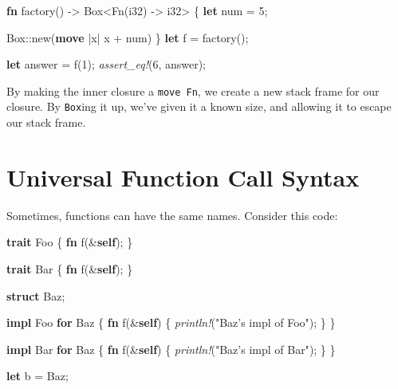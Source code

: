 \documentclass[a4paper,]{book}
\newenvironment{Shaded}{\begin{snugshade}}{\end{snugshade}}
\newcommand{\KeywordTok}[1]{\textcolor[rgb]{0.13,0.29,0.53}{\textbf{{#1}}}}
\newcommand{\DataTypeTok}[1]{\textcolor[rgb]{0.13,0.29,0.53}{{#1}}}
\newcommand{\DecValTok}[1]{\textcolor[rgb]{0.00,0.00,0.81}{{#1}}}
\newcommand{\StringTok}[1]{\textcolor[rgb]{0.31,0.60,0.02}{{#1}}}
\newcommand{\BuiltInTok}[1]{{#1}}
\newcommand{\PreprocessorTok}[1]{\textcolor[rgb]{0.56,0.35,0.01}{\textit{{#1}}}}
\newcommand{\NormalTok}[1]{{#1}}
\begin{document}
\begin{Shaded}
\begin{Highlighting}[]
\KeywordTok{fn} \NormalTok{factory() -> }\DataTypeTok{Box}\NormalTok{<}\BuiltInTok{Fn}\NormalTok{(}\DataTypeTok{i32}\NormalTok{) -> }\DataTypeTok{i32}\NormalTok{> \{}
    \KeywordTok{let} \NormalTok{num = }\DecValTok{5}\NormalTok{;}

    \DataTypeTok{Box}\NormalTok{::new(}\KeywordTok{move} \NormalTok{|x| x + num)}
\NormalTok{\}}
\KeywordTok{let} \NormalTok{f = factory();}

\KeywordTok{let} \NormalTok{answer = f(}\DecValTok{1}\NormalTok{);}
\PreprocessorTok{assert_eq!}\NormalTok{(}\DecValTok{6}\NormalTok{, answer);}
\end{Highlighting}
\end{Shaded}

By making the inner closure a \texttt{move\ Fn}, we create a new stack
frame for our closure. By \texttt{Box}ing it up, we've given it a known
size, and allowing it to escape our stack frame.

\section{Universal Function Call Syntax}\label{sec--ufcs}

Sometimes, functions can have the same names. Consider this code:

\begin{Shaded}
\begin{Highlighting}[]
\KeywordTok{trait} \NormalTok{Foo \{}
    \KeywordTok{fn} \NormalTok{f(&}\KeywordTok{self}\NormalTok{);}
\NormalTok{\}}

\KeywordTok{trait} \NormalTok{Bar \{}
    \KeywordTok{fn} \NormalTok{f(&}\KeywordTok{self}\NormalTok{);}
\NormalTok{\}}

\KeywordTok{struct} \NormalTok{Baz;}

\KeywordTok{impl} \NormalTok{Foo }\KeywordTok{for} \NormalTok{Baz \{}
    \KeywordTok{fn} \NormalTok{f(&}\KeywordTok{self}\NormalTok{) \{ }\PreprocessorTok{println!}\NormalTok{(}\StringTok{"Baz’s impl of Foo"}\NormalTok{); \}}
\NormalTok{\}}

\KeywordTok{impl} \NormalTok{Bar }\KeywordTok{for} \NormalTok{Baz \{}
    \KeywordTok{fn} \NormalTok{f(&}\KeywordTok{self}\NormalTok{) \{ }\PreprocessorTok{println!}\NormalTok{(}\StringTok{"Baz’s impl of Bar"}\NormalTok{); \}}
\NormalTok{\}}

\KeywordTok{let} \NormalTok{b = Baz;}
\end{Highlighting}
\end{Shaded}
\end{document}
